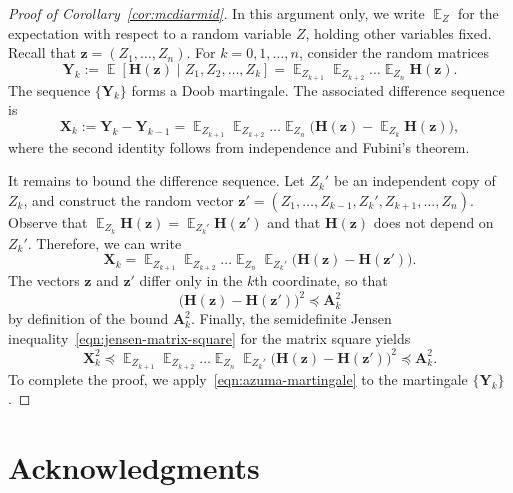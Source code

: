 \documentclass[11pt,letterpaper,twoside,reqno,draft]{amsart}
\theoremstyle{remark}
\numberwithin{equation}{section}
\numberwithin{thm}{section}
\begin{document}
\begin{proof}[Proof of Corollary~\ref{cor:mcdiarmid}]
In this argument only, we write ${\operatorname{\mathbb{E}}}_{Z}$ for the expectation with respect to a random variable $Z$, holding other variables fixed.  Recall that ${\bm{{z}}} = (Z_1, \dots, Z_n)$.  For $k = 0, 1, \dots, n$, consider the random matrices
$$
{\bm{{Y}}}_k := {\operatorname{\mathbb{E}}}[ {\bm{{H}}}({\bm{{z}}}) \; | \; Z_1, Z_2, \dots, Z_{k} ]
	= {\operatorname{\mathbb{E}}}_{Z_{k+1}} {\operatorname{\mathbb{E}}}_{Z_{k+2}} \dots {\operatorname{\mathbb{E}}}_{Z_n}  {\bm{{H}}}({\bm{{z}}}) .
$$
The sequence $\{{\bm{{Y}}}_k\}$ forms a Doob martingale.  The associated difference sequence is
$$
{\bm{{X}}}_k
	:= {\bm{{Y}}}_k - {\bm{{Y}}}_{k-1}
	= {\operatorname{\mathbb{E}}}_{Z_{k+1}} {\operatorname{\mathbb{E}}}_{Z_{k+2}} \dots {\operatorname{\mathbb{E}}}_{Z_n} \big( {\bm{{H}}}({\bm{{z}}}) - {\operatorname{\mathbb{E}}}_{Z_{k}} {\bm{{H}}}({\bm{{z}}}) \big),
$$
where the second identity follows from independence and Fubini's theorem.

It remains to bound the difference sequence.
Let $Z_k'$ be an independent copy of $Z_k$, and construct the random vector ${\bm{{z}}}' = (Z_1, \dots, Z_{k-1}, Z_k', Z_{k+1}, \dots, Z_n)$.  Observe that
$
{\operatorname{\mathbb{E}}}_{Z_k} {\bm{{H}}}({\bm{{z}}}) = {\operatorname{\mathbb{E}}}_{Z_k'} {\bm{{H}}}({\bm{{z}}}')
$
and that ${\bm{{H}}}({\bm{{z}}})$ does not depend on $Z_k'$.  Therefore, we can write
$$
{\bm{{X}}}_k = {\operatorname{\mathbb{E}}}_{Z_{k+1}} {\operatorname{\mathbb{E}}}_{Z_{k+2}} \dots {\operatorname{\mathbb{E}}}_{Z_n} {\operatorname{\mathbb{E}}}_{Z_k'} \big({\bm{{H}}}({\bm{{z}}})-{\bm{{H}}}({\bm{{z}}}') \big).
$$
The vectors ${\bm{{z}}}$ and ${\bm{{z}}}'$ differ only in the $k$th coordinate, so that
$$
\big({\bm{{H}}}({\bm{{z}}}) - {\bm{{H}}}({\bm{{z}}}') \big)^2 {\preccurlyeq} {\bm{{A}}}_k^2
$$
by definition of the bound ${\bm{{A}}}_k^2$.  Finally, the semidefinite Jensen inequality~\eqref{eqn:jensen-matrix-square} for the matrix square yields
$$
{\bm{{X}}}_k^2 {\preccurlyeq} {\operatorname{\mathbb{E}}}_{Z_{k+1}} {\operatorname{\mathbb{E}}}_{Z_{k+2}} \dots {\operatorname{\mathbb{E}}}_{Z_n} {\operatorname{\mathbb{E}}}_{Z_k'} \big( {\bm{{H}}}({\bm{{z}}}) - {\bm{{H}}}({\bm{{z}}}') \big)^2
	{\preccurlyeq} {\bm{{A}}}_k^2.
$$
To complete the proof, we apply~\eqref{eqn:azuma-martingale} to the martingale $\{{\bm{{Y}}}_k\}$.
\end{proof}

\section*{Acknowledgments}
\end{document}
